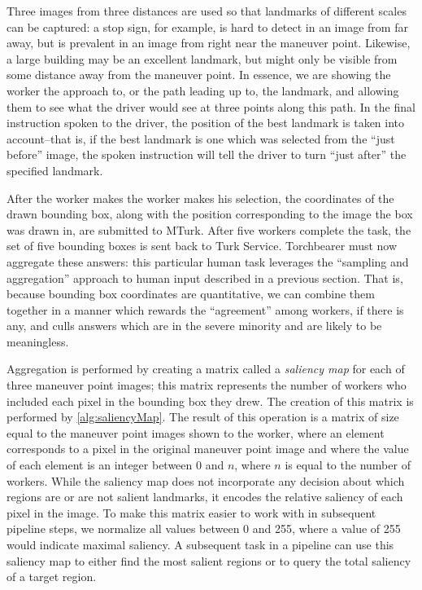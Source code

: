 Three images from three distances are used so that landmarks of different scales can be captured: a stop sign, for example, is hard to detect in an image from far away, but is prevalent in an image from right near the maneuver point. Likewise, a large building may be an excellent landmark, but might only be visible from some distance away from the maneuver point. In essence, we are showing the worker the approach to, or the path leading up to, the landmark, and allowing them to see what the driver would see at three points along this path. In the final instruction spoken to the driver, the position of the best landmark is taken into account--that is, if the best landmark is one which was selected from the “just before” image, the spoken instruction will tell the driver to turn “just after” the specified landmark.

After the worker makes the worker makes his selection, the coordinates of the drawn bounding box, along with the position corresponding to the image the box was drawn in, are submitted to MTurk. After five workers complete the task, the set of five bounding boxes is sent back to Turk Service. Torchbearer must now aggregate these answers: this particular human task leverages the “sampling and aggregation” approach to human input described in a previous section. That is, because bounding box coordinates are quantitative, we can combine them together in a manner which rewards the “agreement” among workers, if there is any, and culls answers which are in the severe minority and are likely to be meaningless. 

Aggregation is performed by creating a matrix called a \textit{saliency map} for each of three maneuver point images; this matrix represents the number of workers who included each pixel in the bounding box they drew. The creation of this matrix is performed by \ref{alg:saliencyMap}. The result of this operation is a matrix of size equal to the maneuver point images shown to the worker, where an element corresponds to a pixel in the original maneuver point image and where the value of each element is an integer between 0 and $n$, where $n$ is equal to the number of workers. While the saliency map does not incorporate any decision about which regions are or are not salient landmarks, it encodes the relative saliency of each pixel in the image. To make this matrix easier to work with in subsequent pipeline steps, we normalize all values between 0 and 255, where a value of 255 would indicate maximal saliency. A subsequent task in a pipeline can use this saliency map to either find the most salient regions or to query the total saliency of a target region.

